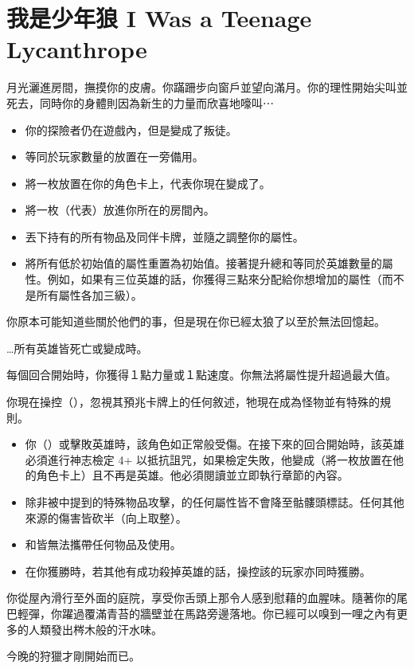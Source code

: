 
\chapter{我是少年狼 I Was a Teenage Lycanthrope}

\begin{HauntStory}
	月光灑進房間，撫摸你的皮膚。你蹣跚步向窗戶並望向滿月。你的理性開始尖叫並死去，同時你的身體則因為新生的力量而欣喜地嚎叫⋯
\end{HauntStory}

\vspace*{-1em}
\begin{itemize}
	\item 你的探險者仍在遊戲內，但是變成了叛徒。
	\item 等同於玩家數量的放置在一旁備用。
	\item 將一枚放置在你的角色卡上，代表你現在變成了。
	\item 將一枚（代表）放進你所在的房間內。
	\item 丟下持有的所有物品及同伴卡牌，並隨之調整你的屬性。
	\item 將所有低於初始值的屬性重置為初始值。接著提升總和等同於英雄數量的屬性。例如，如果有三位英雄的話，你獲得三點來分配給你想增加的屬性（而不是所有屬性各加三級）。
\end{itemize}

你原本可能知道些關於他們的事，但是現在你已經太狼了以至於無法回憶起。

…所有英雄皆死亡或變成時。

每個回合開始時，你獲得１點力量或１點速度。你無法將屬性提升超過最大值。

\vfill\null\pagebreak


你現在操控（），忽視其預兆卡牌上的任何敘述，牠現在成為怪物並有特殊的規則。

\vspace*{-1em}
\begin{itemize}
	\item 你（）或擊敗英雄時，該角色如正常般受傷。在接下來的回合開始時，該英雄必須進行神志檢定 4+ 以抵抗詛咒，如果檢定失敗，他變成（將一枚放置在他的角色卡上）且不再是英雄。他必須閱讀並立即執行章節的內容。
	\item 除非被中提到的特殊物品攻擊，的任何屬性皆不會降至骷髏頭標誌。任何其他來源的傷害皆砍半（向上取整）。
	\item {}和皆無法攜帶任何物品及使用。
	\item 在你獲勝時，若其他有成功殺掉英雄的話，操控該的玩家亦同時獲勝。
\end{itemize}

\begin{HauntStory}
	你從屋內滑行至外面的庭院，享受你舌頭上那令人感到慰藉的血腥味。隨著你的尾巴輕彈，你躍過覆滿青苔的牆壁並在馬路旁邊落地。你已經可以嗅到一哩之內有更多的人類發出梣木般的汗水味。

	今晚的狩獵才剛開始而已。
\end{HauntStory}

